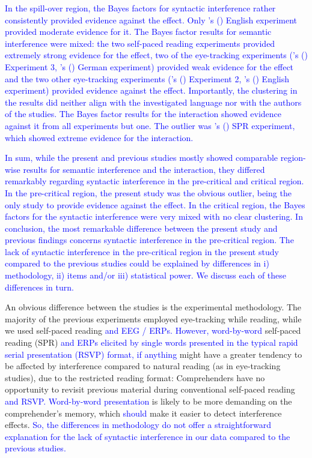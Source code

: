 \documentclass[a4paper, man, floatsintext]{apa7}
\begin{document}
{{\textcolor{blue}{In the spill-over region, the Bayes factors for syntactic interference rather consistently provided evidence against the effect. Only \citeauthor{mertzen}'s (\citeyear{mertzen}) English experiment provided moderate evidence for it. The Bayes factor results for semantic interference were mixed: the two self-paced reading experiments provided extremely strong evidence for the effect, two of the eye-tracking experiments (\citeauthor{vandyke07}'s (\citeyear{vandyke07}) Experiment 3, \citeauthor{mertzen}'s (\citeyear{mertzen}) German experiment) provided weak evidence for the effect and the two other eye-tracking experiments (\citeauthor{vandyke07}'s (\citeyear{vandyke07}) Experiment 2, \citeauthor{mertzen}'s (\citeyear{mertzen}) English experiment) provided evidence against the effect. Importantly, the clustering in the results did neither align with the investigated language nor with the authors of the studies. The Bayes factor results for the interaction showed evidence against it from all experiments but one. The outlier was \citeauthor{vandyke07}'s (\citeyear{vandyke07}) SPR experiment, which showed extreme evidence for the interaction.}

\textcolor{blue}{In sum, while the present and previous studies mostly showed comparable region-wise results for semantic interference and the interaction, they differed remarkably regarding syntactic interference in the pre-critical and critical region. In the pre-critical region, the present study was the obvious outlier, being the only study to provide evidence against the effect. In the critical region, the Bayes factors for the syntactic interference were very mixed with no clear clustering. In conclusion, the most remarkable difference between the present study and previous findings concerns syntactic interference in the pre-critical region. The lack of syntactic interference in the pre-critical region in the present study compared to the previous studies could be explained by differences in i) methodology, ii) items and/or iii) statistical power. We discuss each of these differences in turn.}
}

An obvious difference between the studies is the experimental methodology. The majority of the previous experiments employed eye-tracking while reading, while we used self-paced reading \textcolor{blue}{and EEG / ERPs. However, word-by-word} self-paced reading (SPR) \textcolor{blue}{and ERPs elicited by single words presented in the typical rapid serial presentation (RSVP) format, if anything} might have a greater tendency to be affected by interference compared to natural reading (as in eye-tracking studies), due to the restricted reading format: Comprehenders have no opportunity to revisit previous material during conventional self-paced reading \citep[but see][]{BSPR} \textcolor{blue}{and RSVP. Word-by-word presentation} is likely to be more demanding on the comprehender's memory, which \textcolor{blue}{should} make it easier to detect interference effects. \textcolor{blue}{So, the differences in methodology do not offer a straightforward explanation for the lack of syntactic interference in our data compared to the previous studies.}

}
\end{document}

